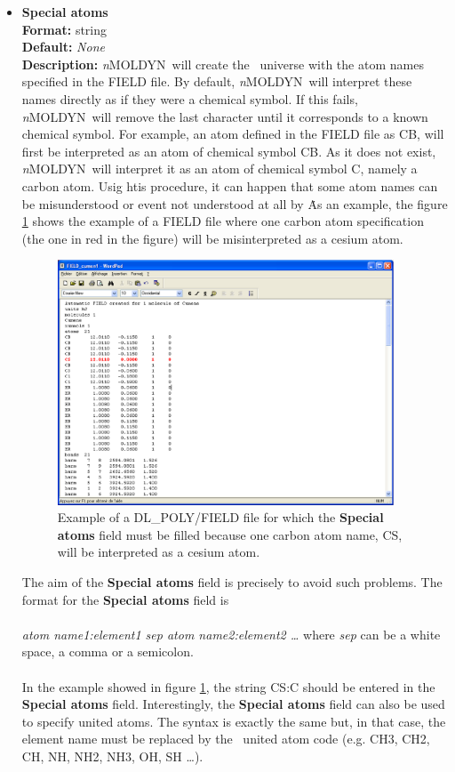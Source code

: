 \documentclass[a4paper,11pt]{report}
\newcommand{\NMOLDYN}{\textit{n}MOLDYN}
\begin{document}
\begin{itemize}
\hypertarget{dlpoly_converter_special_atoms}{}
\item \textbf{Special atoms}\\
\textbf{Format:} string\\
\textbf{Default:} \textit{None}\\
\textbf{Description:} \NMOLDYN\ will create the \MMTK\ universe with the atom names specified in the FIELD file. 
By default, \NMOLDYN\ will interpret these names directly as if they were a chemical symbol. If this fails, 
\NMOLDYN\ will remove the last character until it corresponds to a known chemical symbol. For example, an 
atom defined in the FIELD file as CB, will first be interpreted as an atom of chemical symbol CB. As it does not 
exist, \NMOLDYN\ will interpret it as an atom of chemical symbol C, namely a carbon atom. Usig htis procedure, 
it can happen that some atom names can be misunderstood or event not understood at all by \MMTK\. 
As an example, the figure \ref{fig:dlpoly_field_example} shows the example of a FIELD file 
where one carbon atom specification (the one in red in the figure) will be misinterpreted as a cesium atom.
\newpage
\begin{figure}[h!]
\begin{center}
\includegraphics[width=10cm]{Figures/dlpoly_field_example.eps}
\end{center}
\caption[Example of a DL\_POLY/FIELD file]{Example of a DL\_POLY/FIELD file for which the \textbf{Special atoms} field must be 
filled because one carbon atom name, CS, will be interpreted as a cesium atom.}
\label{fig:dlpoly_field_example}
\end{figure}

The aim of the \textbf{Special atoms} field is precisely to avoid such problems. The format for the 
\textbf{Special atoms} field is
\\\\
\textit{atom name1:element1 sep atom name2:element2 \ldots} where \textit{sep} can be a white space, a comma or a semicolon.
\\\\
In the example showed in figure \ref{fig:dlpoly_field_example}, the string CS:C should be entered in the \textbf{Special atoms} field.
Interestingly, the \textbf{Special atoms} field can also be used to specify united atoms. The syntax is exactly the same but, in 
that case, the element name must be replaced by the \MMTK\ united atom code (e.g. CH3, CH2, CH, NH, NH2, NH3, OH, SH \ldots ).


\end{itemize}
\end{document}
